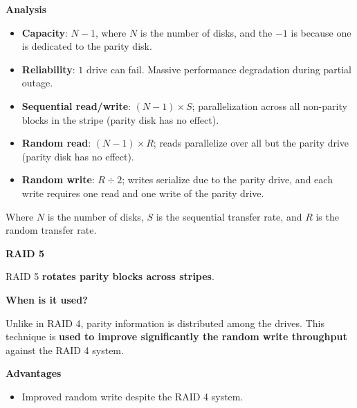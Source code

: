 \highspace
\begin{flushleft}
    \textcolor{Green3}{ \textbf{Analysis}}
\end{flushleft}
\begin{itemize}
    \item \textbf{Capacity}: $N - 1$, where $N$ is the number of disks, and the $-1$ is because one is dedicated to the parity disk.

    \item \textbf{Reliability}: $1$ drive can fail. Massive performance degradation during partial outage.

    \item \textbf{Sequential read/write}: $\left(N - 1\right) \times S$; parallelization across all non-parity blocks in the stripe (parity disk has no effect).

    \item \textbf{Random read}: $\left(N - 1\right) \times R$; reads parallelize over all but the parity drive (parity disk has no effect).

    \item \textbf{Random write}: $R \div 2$; writes serialize due to the parity drive, and each write requires one read and one write of the parity drive.
\end{itemize}
Where $N$ is the number of disks, $S$ is the sequential transfer rate, and $R$ is the random transfer rate.

\newpage

\begin{center}\label{RAID 5}
    \large
    \hypertarget{RAID 5}{\textcolor{Red2}{\textbf{RAID 5}}}
\end{center}

\noindent
RAID 5 \textbf{rotates parity blocks across stripes}.

\highspace
\begin{flushleft}
    \textcolor{Green3}{ \textbf{When is it used?}}
\end{flushleft}
Unlike in RAID 4, parity information is distributed among the drives. This technique is \textbf{used to improve significantly the random write throughput} against the RAID 4 system.

\highspace
\begin{flushleft}
    \textcolor{Green3}{ \textbf{Advantages}}
\end{flushleft}
\begin{itemize}
    \item Improved random write despite the RAID 4 system.
\end{itemize}


